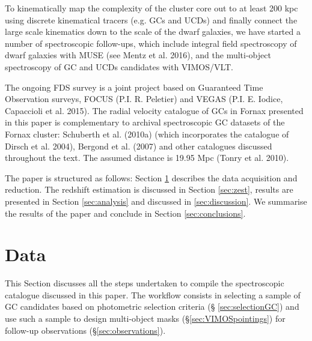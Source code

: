 \documentclass[useAMS,usenatbib]{mn2e}
\begin{document}
To kinematically map the complexity of the cluster core out to at least 200 kpc using discrete kinematical tracers (e.g. GCs and UCDs) and finally connect the large scale kinematics down to the scale of the dwarf galaxies, we have started a number of spectroscopic follow-ups, which include integral field spectroscopy of dwarf galaxies with MUSE (see Mentz et al. 2016), and the multi-object spectroscopy  of GC and UCDs candidates with VIMOS/VLT.

The ongoing FDS survey is a joint project based on Guaranteed Time Observation surveys, FOCUS (P.I. R. Peletier) and VEGAS (P.I. E. Iodice, Capaccioli et al. 2015).
The radial velocity catalogue of GCs in Fornax presented in this paper is complementary to archival spectroscopic GC datasets of the Fornax cluster: Schuberth et al. (2010a) (which incorporates the catalogue of Dirsch et al. 2004), Bergond et al. (2007) and other catalogues discussed throughout the text. 
The assumed distance is 19.95 Mpc (Tonry et al. 2010).  

The paper is structured as follows: Section \ref{sec:data} describes the data acquisition and reduction. The redshift estimation is discussed in Section \ref{sec:zest}, results are presented in Section \ref{sec:analysis} and discussed in \ref{sec:discussion}. We summarise the results of the paper and conclude in Section \ref{sec:conclusions}. 

\section{Data}
\label{sec:data}

This Section discusses all the steps undertaken to compile the spectroscopic catalogue discussed in this paper. The 
workflow consists in selecting a sample of GC candidates based on photometric selection criteria (\S 
\ref{sec:selectionGC}) and use such a sample to design multi-object masks (\S \ref{sec:VIMOSpointings}) for follow-up 
observations (\S \ref{sec:observations}).
\end{document}
